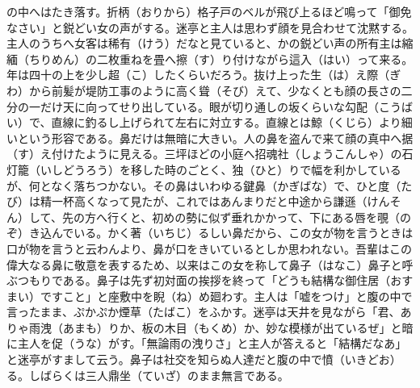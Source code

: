 \documentclass{book}
\begin{document}
の中へはたき落す。折柄（おりから）格子戸のベルが飛び上るほど鳴って「御免なさい」と鋭どい女の声がする。迷亭と主人は思わず顔を見合わせて沈黙する。\\
主人のうちへ女客は稀有（けう）だなと見ていると、かの鋭どい声の所有主は縮緬（ちりめん）の二枚重ねを畳へ擦（す）り付けながら這入（はい）って来る。年は四十の上を少し超（こ）したくらいだろう。抜け上った生（は）え際（ぎわ）から前髪が堤防工事のように高く聳（そび）えて、少なくとも顔の長さの二分の一だけ天に向ってせり出している。眼が切り通しの坂くらいな勾配（こうばい）で、直線に釣るし上げられて左右に対立する。直線とは鯨（くじら）より細いという形容である。鼻だけは無暗に大きい。人の鼻を盗んで来て顔の真中へ据（す）え付けたように見える。三坪ほどの小庭へ招魂社（しょうこんしゃ）の石灯籠（いしどうろう）を移した時のごとく、独（ひと）りで幅を利かしているが、何となく落ちつかない。その鼻はいわゆる鍵鼻（かぎばな）で、ひと度（たび）は精一杯高くなって見たが、これではあんまりだと中途から謙遜（けんそん）して、先の方へ行くと、初めの勢に似ず垂れかかって、下にある唇を覗（のぞ）き込んでいる。かく著（いちじ）るしい鼻だから、この女が物を言うときは口が物を言うと云わんより、鼻が口をきいているとしか思われない。吾輩はこの偉大なる鼻に敬意を表するため、以来はこの女を称して鼻子（はなこ）鼻子と呼ぶつもりである。鼻子は先ず初対面の挨拶を終って「どうも結構な御住居（おすまい）ですこと」と座敷中を睨（ね）め廻わす。主人は「嘘をつけ」と腹の中で言ったまま、ぷかぷか煙草（たばこ）をふかす。迷亭は天井を見ながら「君、ありゃ雨洩（あまも）りか、板の木目（もくめ）か、妙な模様が出ているぜ」と暗に主人を促（うな）がす。「無論雨の洩りさ」と主人が答えると「結構だなあ」と迷亭がすまして云う。鼻子は社交を知らぬ人達だと腹の中で憤（いきどお）る。しばらくは三人鼎坐（ていざ）のまま無言である。\\
\end{document}
